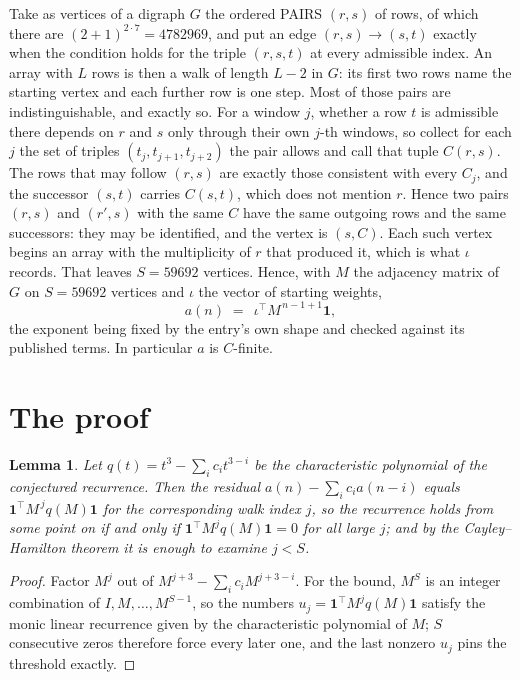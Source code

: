 \documentclass[11pt,a4paper]{article}
\theoremstyle{plain}
\newtheorem{lemma}[theorem]{Lemma}
\theoremstyle{definition}
\begin{document}
Take as vertices of a digraph $G$ the ordered PAIRS $(r,s)$ of rows, of which there are
$(2+1)^{2\cdot7}=4782969$, and put an edge $(r,s)\to(s,t)$ exactly when the condition
holds for the triple $(r,s,t)$ at every admissible index. An array with $L$ rows is then a
walk of length $L-2$ in $G$: its first two rows name the starting vertex and each further
row is one step. Most of those pairs are indistinguishable, and exactly so. For a window $j$, whether a row $t$ is admissible there depends on $r$ and $s$ only through their own $j$-th windows, so collect for each $j$ the set of triples $(t_j,t_{j+1},t_{j+2})$ the pair allows and call that tuple $C(r,s)$. The rows that may follow $(r,s)$ are exactly those consistent with every $C_j$, and the successor $(s,t)$ carries $C(s,t)$, which does not mention $r$. Hence two pairs $(r,s)$ and $(r',s)$ with the same $C$ have the same outgoing rows and the same successors: they may be identified, and the vertex is $(s,C)$. Each such vertex begins an array with the multiplicity of $r$ that produced it, which is what $\iota$ records. That leaves $S=59692$ vertices. Hence, with $M$ the adjacency matrix of $G$ on $S=59692$ vertices and
$\iota$ the vector of starting weights,
\[
a(n)\;=\;\,\iota^{\!\top}M^{\,n-1+1}\mathbf{1},
\]
the exponent being fixed by the entry's own shape and checked against its published terms.
In particular $a$ is $C$-finite.

\section{The proof}

\begin{lemma}\label{lem:crit}
Let $q(t)=t^{3}-\sum_i c_it^{3-i}$ be the characteristic polynomial of the
conjectured recurrence. Then the residual $a(n)-\sum_ic_ia(n-i)$ equals
$\mathbf{1}^{\!\top}M^{\,j}q(M)\mathbf{1}$ for the corresponding walk index
$j$, so the recurrence holds from some point on if and only if
$\mathbf{1}^{\!\top}M^{j}q(M)\mathbf{1}=0$ for all large $j$; and by the
Cayley--Hamilton theorem it is enough to examine $j<S$.
\end{lemma}

\begin{proof}
Factor $M^{j}$ out of $M^{j+3}-\sum_ic_iM^{j+3-i}$. For the bound, $M^{S}$
is an integer combination of $I,M,\dots,M^{S-1}$, so the numbers
$u_j=\mathbf{1}^{\!\top}M^{j}q(M)\mathbf{1}$ satisfy the monic linear recurrence given by
the characteristic polynomial of $M$; $S$ consecutive zeros therefore force every later one,
and the last nonzero $u_j$ pins the threshold exactly.
\end{proof}
\end{document}
